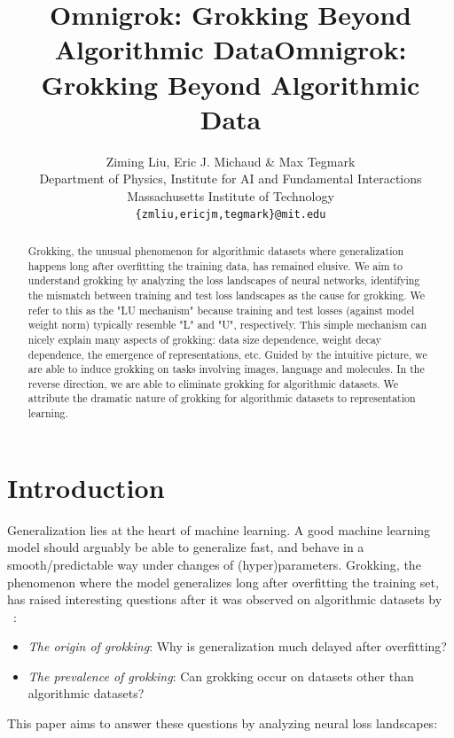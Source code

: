 \documentclass{article} %
\title{Omnigrok: Grokking Beyond Algorithmic Data}
\author{Ziming Liu, Eric J. Michaud \& Max Tegmark \\
Department of Physics, Institute for AI and Fundamental Interactions\\
Massachusetts Institute of Technology\\
\texttt{\{zmliu,ericjm,tegmark\}@mit.edu}
}
\title{Omnigrok: Grokking Beyond Algorithmic Data}
\begin{document}
\maketitle

\begin{abstract}
Grokking, the unusual phenomenon for algorithmic datasets where generalization happens long after overfitting the training data, has remained elusive. We aim to understand grokking by analyzing the loss landscapes of neural networks, identifying the mismatch between training and test loss landscapes as the cause for grokking. We refer to this as the "LU mechanism" because training and test losses (against model weight norm) typically resemble "L" and "U", respectively. This simple mechanism can nicely explain many aspects of grokking: data size dependence, weight decay dependence, the emergence of representations, etc. Guided by the intuitive picture, we are able to induce grokking on tasks involving images, language and molecules. In the reverse direction, we are able to eliminate grokking for algorithmic datasets. We attribute the dramatic nature of grokking for algorithmic datasets to representation learning.
\end{abstract}


\section{Introduction}

Generalization lies at the heart of machine learning. A good machine learning model should arguably be able to generalize fast, and behave in a smooth/predictable way under changes of (hyper)parameters. Grokking, the phenomenon where the model generalizes long after overfitting the training set, has raised interesting questions after it was observed on algorithmic datasets by ~\citep{power2022grokking}:


\begin{itemize}
  \item[\bf Q1]\textit{The origin of grokking}: Why is generalization much delayed after overfitting? 
  \item[\bf Q2]\textit{The prevalence of grokking}: Can grokking occur on datasets other than algorithmic datasets?
\end{itemize}

This paper aims to answer these questions by analyzing neural loss landscapes:
\end{document}
